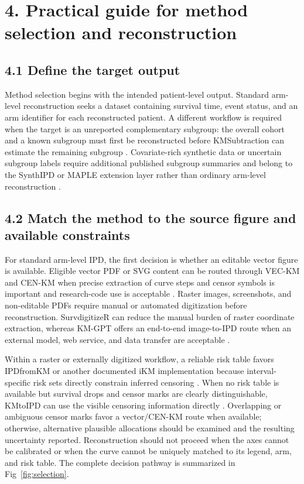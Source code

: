 \documentclass[12pt,letterpaper]{article}
\begin{document}
\section*{4. Practical guide for method selection and reconstruction}

\subsection*{4.1 Define the target output}

Method selection begins with the intended patient-level output. Standard arm-level reconstruction seeks a dataset containing survival time, event status, and an arm identifier for each reconstructed patient. A different workflow is required when the target is an unreported complementary subgroup: the overall cohort and a known subgroup must first be reconstructed before KMSubtraction can estimate the remaining subgroup \cite{zhao2022}. Covariate-rich synthetic data or uncertain subgroup labels require additional published subgroup summaries and belong to the SynthIPD or MAPLE extension layer rather than ordinary arm-level reconstruction \cite{synthipd2026,resolve2026}.

\subsection*{4.2 Match the method to the source figure and available constraints}

For standard arm-level IPD, the first decision is whether an editable vector figure is available. Eligible vector PDF or SVG content can be routed through VEC-KM and CEN-KM when precise extraction of curve steps and censor symbols is important and research-code use is acceptable \cite{resolve2026}. Raster images, screenshots, and non-editable PDFs require manual or automated digitization before reconstruction. SurvdigitizeR can reduce the manual burden of raster coordinate extraction, whereas KM-GPT offers an end-to-end image-to-IPD route when an external model, web service, and data transfer are acceptable \cite{zhang2024,kmgpt2025}.

Within a raster or externally digitized workflow, a reliable risk table favors IPDfromKM or another documented iKM implementation because interval-specific risk sets directly constrain inferred censoring \cite{guyot2012,liu2021}. When no risk table is available but survival drops and censor marks are clearly distinguishable, KMtoIPD can use the visible censoring information directly \cite{rogula2022}. Overlapping or ambiguous censor marks favor a vector/CEN-KM route when available; otherwise, alternative plausible allocations should be examined and the resulting uncertainty reported. Reconstruction should not proceed when the axes cannot be calibrated or when the curve cannot be uniquely matched to its legend, arm, and risk table. The complete decision pathway is summarized in Fig~\ref{fig:selection}.
\end{document}
